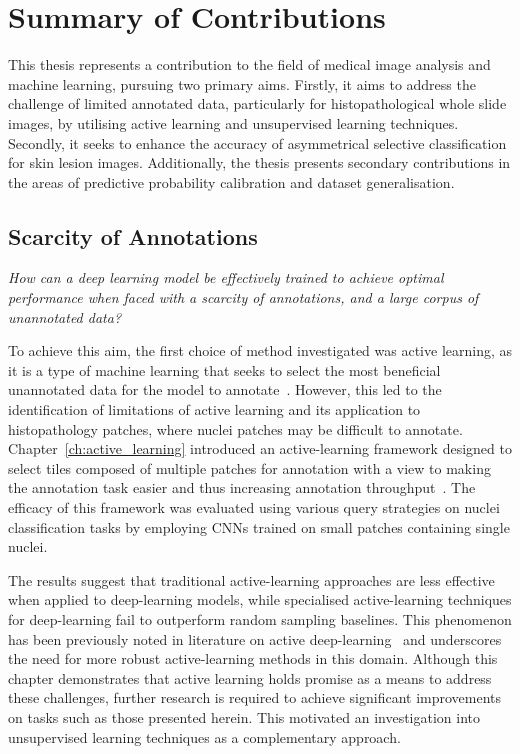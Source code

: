 
\section{Summary of Contributions}
This thesis represents a contribution to the field of medical image analysis and machine learning, pursuing two primary aims. Firstly, it aims to address the challenge of limited annotated data, particularly for histopathological whole slide images, by utilising active learning and unsupervised learning techniques. Secondly, it seeks to enhance the accuracy of asymmetrical selective classification for skin lesion images. Additionally, the thesis presents secondary contributions in the areas of predictive probability calibration and dataset generalisation.

\subsection{Scarcity of Annotations}
\textit{How can a deep learning model be effectively trained to achieve optimal performance when faced with a scarcity of annotations, and a large corpus of unannotated data?}

To achieve this aim, the first choice of method investigated was active learning, as it is a type of machine learning that seeks to select the most beneficial unannotated data for the model to annotate~\citep{settles2009active}. However, this led to the identification of limitations of active learning and its application to histopathology patches, where nuclei patches may be difficult to annotate. Chapter~\ref{ch:active_learning} introduced an active-learning framework designed to select tiles composed of multiple patches for annotation with a view to making the annotation task easier and thus increasing annotation throughput~\citep{carse2019active}. The efficacy of this framework was evaluated using various query strategies on nuclei classification tasks by employing CNNs trained on small patches containing single nuclei. 

The results suggest that traditional active-learning approaches are less effective when applied to deep-learning models, while specialised active-learning techniques for deep-learning fail to outperform random sampling baselines. This phenomenon has been previously noted in literature on active deep-learning~\citep{ren2021survey} and underscores the need for more robust active-learning methods in this domain. Although this chapter demonstrates that active learning holds promise as a means to address these challenges, further research is required to achieve significant improvements on tasks such as those presented herein. This motivated an investigation into unsupervised learning techniques as a complementary approach.

